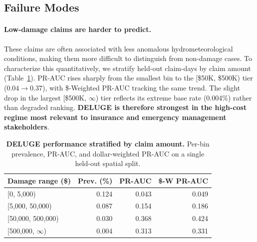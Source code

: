 \vspace{-6pt}
\subsection{Failure Modes}
\label{ssec:failure-modes}
     \paragraph{Low-damage claims are harder to predict.} These claims are often associated with less anomalous hydrometeorological conditions, making them more difficult to distinguish from non-damage cases. 
        To characterize this quantitatively, we stratify held-out claim-days by claim amount (Table~\ref{tab:damage-severity}). 
        PR-AUC rises sharply from the smallest bin to the [\$50K, \$500K) tier ($0.04\to0.37$), with \$-Weighted PR-AUC tracking the same trend. The slight drop in the largest [\$500K, $\infty$) tier reflects its extreme base rate (0.004\%) rather than degraded ranking. 
        \textbf{DELUGE is therefore strongest in the high-cost regime most relevant to insurance and emergency management stakeholders}.
\begin{table}[h]
\centering
\small
\setlength{\tabcolsep}{4pt}
\begin{tabular}{l r r r}
\toprule
\textbf{Damage range (\$)} & \textbf{Prev. (\%)} & \textbf{PR-AUC} & \textbf{\$-W PR-AUC} \\
\midrule
{}[0, 5{,}000)              & 0.124  & 0.043 & 0.049 \\
{}[5{,}000, 50{,}000)       & 0.087  & 0.154 & 0.186 \\
{}[50{,}000, 500{,}000)     & 0.030  & 0.368 & 0.424 \\
{}[500{,}000, $\infty$)     & 0.004  & 0.313 & 0.331 \\
\bottomrule
\end{tabular}
\caption{\textbf{DELUGE performance stratified by claim amount.} Per-bin prevalence, PR-AUC, and dollar-weighted PR-AUC on a single held-out spatial split.}
\label{tab:damage-severity}
\end{table}

